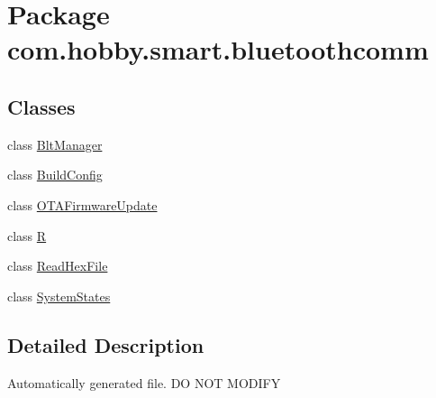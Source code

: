 \hypertarget{namespacecom_1_1hobby_1_1smart_1_1bluetoothcomm}{}\section{Package com.\+hobby.\+smart.\+bluetoothcomm}
\label{namespacecom_1_1hobby_1_1smart_1_1bluetoothcomm}
\subsection*{Classes}
\begin{DoxyCompactItemize}
\item 
class \hyperlink{classcom_1_1hobby_1_1smart_1_1bluetoothcomm_1_1_blt_manager}{Blt\+Manager}
\item 
class \hyperlink{classcom_1_1hobby_1_1smart_1_1bluetoothcomm_1_1_build_config}{Build\+Config}
\item 
class \hyperlink{classcom_1_1hobby_1_1smart_1_1bluetoothcomm_1_1_o_t_a_firmware_update}{O\+T\+A\+Firmware\+Update}
\item 
class \hyperlink{classcom_1_1hobby_1_1smart_1_1bluetoothcomm_1_1_r}{R}
\item 
class \hyperlink{classcom_1_1hobby_1_1smart_1_1bluetoothcomm_1_1_read_hex_file}{Read\+Hex\+File}
\item 
class \hyperlink{classcom_1_1hobby_1_1smart_1_1bluetoothcomm_1_1_system_states}{System\+States}
\end{DoxyCompactItemize}


\subsection{Detailed Description}
Automatically generated file. DO N\+OT M\+O\+D\+I\+FY 